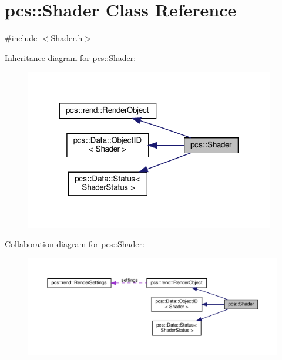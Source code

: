\hypertarget{classpcs_1_1Shader}{}\section{pcs\+:\+:Shader Class Reference}
\label{classpcs_1_1Shader}


{\ttfamily \#include $<$Shader.\+h$>$}



Inheritance diagram for pcs\+:\+:Shader\+:\nopagebreak
\begin{figure}[H]
\begin{center}
\leavevmode
\includegraphics[width=308pt]{classpcs_1_1Shader__inherit__graph}
\end{center}
\end{figure}


Collaboration diagram for pcs\+:\+:Shader\+:\nopagebreak
\begin{figure}[H]
\begin{center}
\leavevmode
\includegraphics[width=350pt]{classpcs_1_1Shader__coll__graph}
\end{center}
\end{figure}
